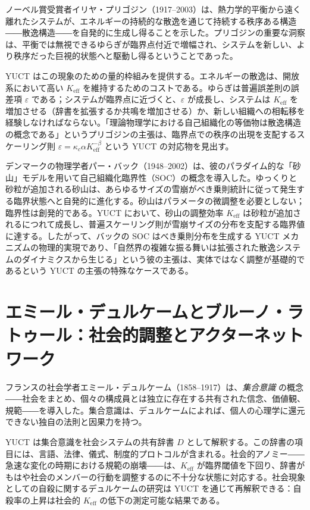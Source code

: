 \documentclass[12pt,a4paper]{article}
\begin{document}
	ノーベル賞受賞者イリヤ・プリゴジン（1917–2003）は、熱力学的平衡から遠く離れたシステムが、エネルギーの持続的な散逸を通じて持続する秩序ある構造――散逸構造――を自発的に生成し得ることを示した。プリゴジンの重要な洞察は、平衡では無視できるゆらぎが臨界点付近で増幅され、システムを新しい、より秩序だった巨視的状態へと駆動し得るということであった。
	
	YUCT はこの現象のための量的枠組みを提供する。エネルギーの散逸は、開放系において高い \(K_{\mathrm{eff}}\) を維持するためのコストである。ゆらぎは普遍誤差則の誤差項 \(\varepsilon\) である；システムが臨界点に近づくと、\(\varepsilon\) が成長し、システムは \(K_{\mathrm{eff}}\) を増加させる（辞書を拡張するか共鳴を増加させる）か、新しい組織への相転移を経験しなければならない。「理論物理学における自己組織化の等価物は散逸構造の概念である」というプリゴジンの主張は、臨界点での秩序の出現を支配するスケーリング則 \(\varepsilon = \kappa_c \alpha K_{\mathrm{eff}}^{-\beta}\) という YUCT の対応物を見出す。
	
	デンマークの物理学者パー・バック（1948–2002）は、彼のパラダイム的な「砂山」モデルを用いて自己組織化臨界性（SOC）の概念を導入した。ゆっくりと砂粒が追加される砂山は、あらゆるサイズの雪崩がべき乗則統計に従って発生する臨界状態へと自発的に進化する。砂山はパラメータの微調整を必要としない；臨界性は創発的である。YUCT において、砂山の調整効率 \(K_{\mathrm{eff}}\) は砂粒が追加されるにつれて成長し、普遍スケーリング則が雪崩サイズの分布を支配する臨界値に達する。したがって、バックの SOC はべき乗則分布を生成する YUCT メカニズムの物理的実現であり、「自然界の複雑な振る舞いは拡張された散逸システムのダイナミクスから生じる」という彼の主張は、実体ではなく調整が基礎的であるという YUCT の主張の特殊なケースである。
	
	\section{エミール・デュルケームとブルーノ・ラトゥール：社会的調整とアクターネットワーク}
	
	フランスの社会学者エミール・デュルケーム（1858–1917）は、\emph{集合意識} の概念――社会をまとめ、個々の構成員とは独立に存在する共有された信念、価値観、規範――を導入した。集合意識は、デュルケームによれば、個人の心理学に還元できない独自の法則と因果力を持つ。
	
	YUCT は集合意識を社会システムの共有辞書 \(D\) として解釈する。この辞書の項目には、言語、法律、儀式、制度的プロトコルが含まれる。社会的アノミー――急速な変化の時期における規範の崩壊――は、\(K_{\mathrm{eff}}\) が臨界閾値を下回り、辞書がもはや社会のメンバーの行動を調整するのに不十分な状態に対応する。社会現象としての自殺に関するデュルケームの研究は YUCT を通じて再解釈できる：自殺率の上昇は社会的 \(K_{\mathrm{eff}}\) の低下の測定可能な結果である。
	
\end{document}
